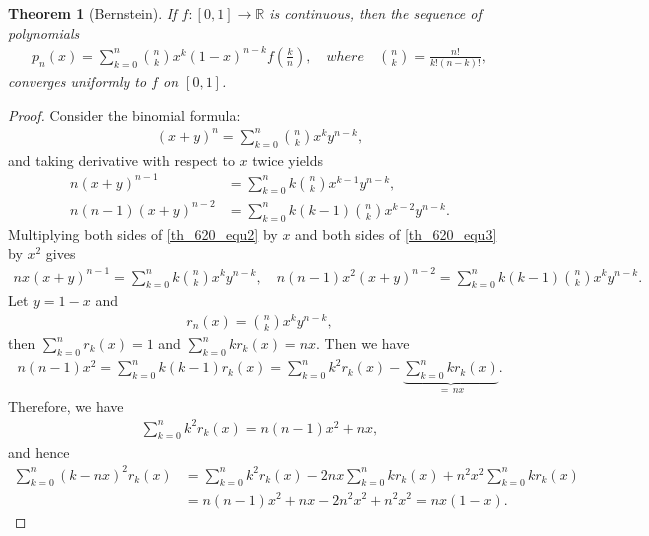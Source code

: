 \documentclass[11pt]{book}
\newtheorem{theorem}{Theorem}[chapter]
\theoremstyle{definition}
\numberwithin{equation}{chapter}
\begin{document}
\begin{theorem}[Bernstein]\label{th_620}
If $f: [0,1] \to \mathbb{R}$ is continuous, then the sequence of polynomials
\begin{align*}
    p_n(x) = \sum^n_{k=0} \binom{n}{k} x^k (1 - x)^{n-k} f \left(\frac{k}{n}\right), \quad where \quad \binom{n}{k} = \frac{n!}{k!(n-k)!},
\end{align*}
converges uniformly to $f$ on $[0,1]$.
\end{theorem}
\begin{proof}
Consider the binomial formula:
\begin{align}\label{th_620_equ1}
    (x + y)^n = \sum^n_{k=0} \binom{n}{k} x^k y^{n-k},
\end{align}
and taking derivative with respect to $x$ twice yields
\begin{align}
    n(x + y)^{n-1} & = \sum^n_{k=0} k\binom{n}{k} x^{k-1} y^{n-k}, \label{th_620_equ2}\\
    n(n - 1)(x + y)^{n-2} & = \sum^n_{k=0} k(k - 1)\binom{n}{k} x^{k-2} y^{n-k}. \label{th_620_equ3}
\end{align}
Multiplying both sides of \eqref{th_620_equ2} by $x$ and both sides of \eqref{th_620_equ3} by $x^2$ gives
\begin{align*}
    nx(x + y)^{n-1} = \sum^n_{k=0} k\binom{n}{k} x^{k} y^{n-k}, \quad n(n - 1)x^2(x + y)^{n-2} = \sum^n_{k=0} k(k - 1)\binom{n}{k} x^{k} y^{n-k}.
\end{align*}
Let $y = 1 - x$  and
\begin{align*}
    r_n(x) = \binom{n}{k} x^k y^{n-k},
\end{align*}
then $\sum^n_{k=0} r_k(x) = 1$ and $\sum^n_{k=0} k r_k(x) = nx$. Then we have
\begin{align*}
    n(n - 1)x^2 = \sum^n_{k=0} k(k - 1) r_k(x) = \sum^n_{k=0} k^2 r_k(x) - \underbrace{\sum^n_{k=0} k r_k(x)}_{= \, nx}.
\end{align*}
Therefore, we have
\begin{align*}
    \sum^n_{k=0} k^2 r_k(x) = n(n - 1)x^2 + nx,
\end{align*}
and hence
\begin{align*}
    \sum^n_{k=0} (k - nx)^2 r_k(x) & = \sum^n_{k=0} k^2 r_k(x) - 2nx \sum^n_{k=0} k r_k(x) + n^2x^2 \sum^n_{k=0} k r_k(x) \\
    & = n(n - 1)x^2 + nx - 2n^2 x^2 + n^2 x^2 = nx(1 - x).
\end{align*}


\end{proof}
\end{document}
